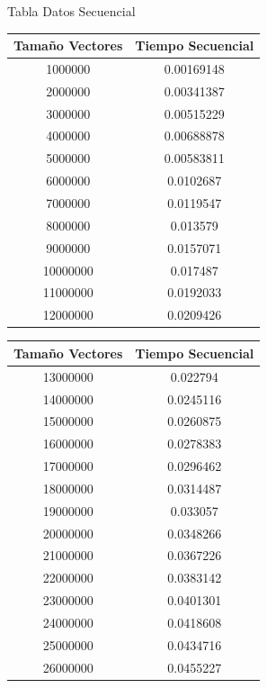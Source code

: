 \documentclass[12pt]{beamer}
\begin{document}
\begin{frame}{Tabla Datos Secuencial}
\begin{tabular}{|c|c|}
\hline 
Tamaño Vectores & Tiempo Secuencial \\ 
\hline 
1000000 & 0.00169148 \\ 
\hline 
2000000 & 0.00341387 \\ 
\hline 
3000000 & 0.00515229 \\ 
\hline 
4000000 & 0.00688878 \\ 
\hline 
5000000 & 0.00583811 \\ 
\hline 
6000000 & 0.0102687 \\ 
\hline 
7000000 & 0.0119547 \\ 
\hline 
8000000 & 0.013579 \\ 
\hline 
9000000 & 0.0157071 \\ 
\hline 
10000000 & 0.017487 \\ 
\hline 
11000000 & 0.0192033 \\ 
\hline 
12000000 & 0.0209426 \\ 
\hline
\end{tabular}
\end{frame}

\begin{frame}
\begin{tabular}{|c|c|}
\hline 
Tamaño Vectores & Tiempo Secuencial \\
\hline
13000000 & 0.022794 \\ 
\hline 
14000000 & 0.0245116 \\ 
\hline 
15000000 & 0.0260875 \\ 
\hline 
16000000 & 0.0278383 \\ 
\hline 
17000000 & 0.0296462 \\ 
\hline 
18000000 & 0.0314487 \\ 
\hline 
19000000 & 0.033057 \\ 
\hline 
20000000 & 0.0348266 \\ 
\hline 
21000000 & 0.0367226 \\ 
\hline 
22000000 & 0.0383142 \\ 
\hline 
23000000 & 0.0401301 \\ 
\hline 
24000000 & 0.0418608 \\ 
\hline 
25000000 & 0.0434716 \\ 
\hline 
26000000 & 0.0455227 \\ 
\hline 
\end{tabular} 
\end{frame}
\end{document}
